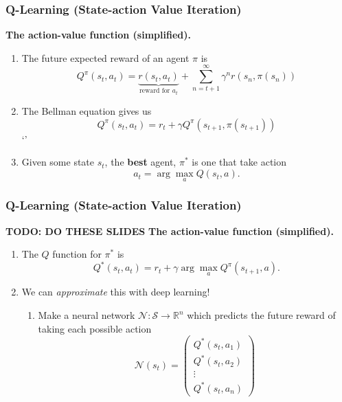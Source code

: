 \documentclass{beamer}
\numberwithin{equation}{subsection}
\numberwithin{theorem}{subsection}
\def\scriptn{{\mathcal N}}
\def\scripts{{\mathcal S}}
\begin{document}
\begin{frame}
\frametitle{Q-Learning (State-action Value Iteration)}
  \textbf{The action-value function (simplified).}
  \begin{enumerate}
    \item  The future expected reward of an agent $\pi$ is
    \begin{equation*}
      Q^\pi(s_t, a_t) = \underbrace{r(s_t, a_t)}_{\text{reward for } a_t} + \sum_{n={t+1}}^\infty \gamma^n r(s_n, \pi(s_n))
    \end{equation*}
    \item The Bellman equation gives us 
    \begin{equation*}
      Q^\pi(s_t, a_t) = r_t + \gamma Q^\pi(s_{t+1}, \pi(s_{t+1}))
    \end{equation*}`'
    \item Given some state $s_t$, the \textbf{best} agent, $\pi^*$ is one that take action 
    \begin{equation*}
      a_t = \arg \max_a Q(s_t, a).   
    \end{equation*}
  \end{enumerate}
\end{frame}

\begin{frame}
\frametitle{Q-Learning (State-action Value Iteration)}
\textbf{TODO: DO THESE SLIDES}
  \textbf{The action-value function (simplified).}
  \begin{enumerate}
    \item The $Q$ function for $\pi^*$ is
    \begin{equation*}
      Q^*(s_t, a_t) = r_t + \gamma \arg \max_a Q^\pi(s_{t+1}, a).
    \end{equation*}
    \item We can \emph{approximate} this with deep learning!
    \begin{enumerate}
      \item Make a neural network $\scriptn: \scripts \to \mathbb{R}^n$ which predicts 
      the future reward of taking each possible action
      \begin{equation*}
        \scriptn(s_t) =\begin{pmatrix}
            Q^*(s_t, a_1) \\
             Q^*(s_t, a_2)\\
             \vdots \\
              Q^*(s_t, a_n)
        \end{pmatrix}
      \end{equation*}
    \end{enumerate}
  \end{enumerate}
\end{frame}
\end{document}
